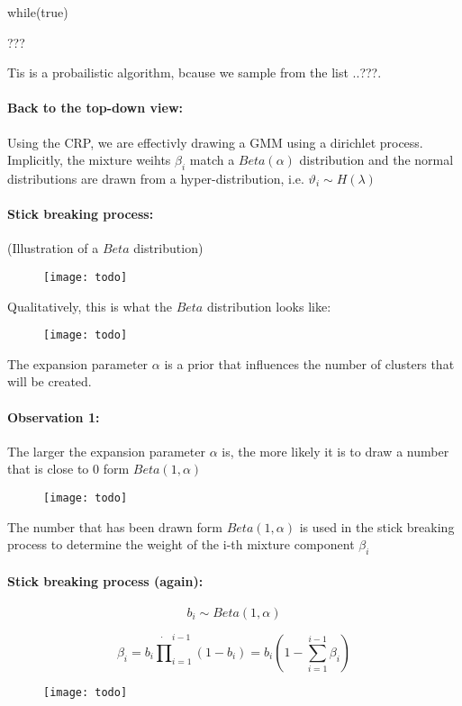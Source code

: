 while(true)

???

Tis is a probailistic algorithm, bcause we sample from the list ..???.

\paragraph{Back to the top-down view:}
Using the CRP, we are effectivly drawing a GMM using a dirichlet process. Implicitly, the mixture weihts $\beta_i$ match a $Beta(\alpha)$ distribution and the normal distributions are drawn from a hyper-distribution, i.e. $\vartheta_i \sim H(\lambda)$

\paragraph{Stick breaking process:}
(Illustration of a $Beta$ distribution)

\begin{figure}[H]
	\centering
	\texttt{[image: todo]}
\end{figure}

Qualitatively, this is what the $Beta$ distribution looks like:

\begin{figure}[H]
	\centering
	\texttt{[image: todo]}
\end{figure}

The expansion parameter $\alpha$ is a prior that influences the number of clusters that will be created.

\paragraph{Observation 1:}
The larger the expansion parameter $\alpha$ is, the more likely it is to draw a number that is close to $0$ form $Beta(1,\alpha)$

\begin{figure}[H]
	\centering
	\texttt{[image: todo]}
\end{figure}

The number that has been drawn form $Beta(1,\alpha)$ is used in the stick breaking process to determine the weight of the i-th mixture component $\beta_i$

\paragraph{Stick breaking process (again):}

\begin{equation*}
	b_i \sim Beta(1,\alpha)
\end{equation*}

\begin{equation*}
	\beta_i = b_i \dot \prod_{i=1}^{i-1}(1-b_i) = b_i (1 - \sum_{i=1}^{i-1} \beta_i)
\end{equation*}

\begin{figure}[H]
	\centering
	\texttt{[image: todo]}
\end{figure}
